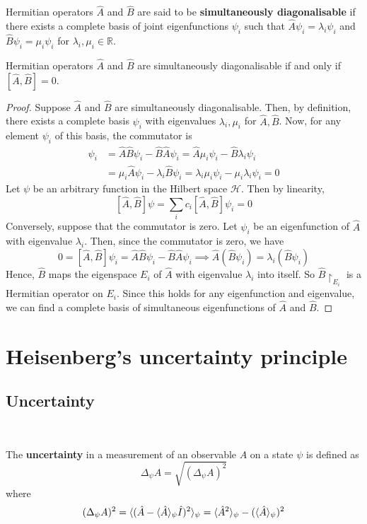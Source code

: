 \documentclass[a4paper,11pt]{article}
\begin{document}
\begin{definition}
	Hermitian operators \( \hat A \) and \( \hat B \) are said to be \textbf{simultaneously diagonalisable} if there exists a complete basis of joint eigenfunctions \( {\psi_i} \) such that \( \hat A \psi_i = \lambda_i \psi_i \) and \( \hat B \psi_i = \mu_i \psi_i \) for \( \lambda_i, \mu_i \in \mathbb R \).
\end{definition}

\begin{theorem}
	Hermitian operators \( \hat A \) and \( \hat B \) are simultaneously diagonalisable if and only if \( [\hat A, \hat B] = 0 \).
\end{theorem}
\begin{proof}
	Suppose \( \hat A \) and \( \hat B \) are simultaneously diagonalisable.
	Then, by definition, there exists a complete basis \( {\psi_i} \) with eigenvalues \( \lambda_i, \mu_i \) for \( \hat A, \hat B \).
	Now, for any element \( \psi_i \) of this basis, the commutator is
	\begin{align*}
        [\hat A, \hat B] \psi_i &= \hat A \hat B \psi_i - \hat B \hat A \psi_i = \hat A \mu_i \psi_i - \hat B \lambda_i \psi_i \\ 
        &= \mu_i \hat A \psi_i - \lambda_i \hat B \psi_i = \lambda_i \mu_i \psi_i - \mu_i \lambda_i \psi_i = 0
    \end{align*}
	Let \( \psi \) be an arbitrary function in the Hilbert space \( \mathcal H \).
	Then by linearity,
	\[
		[\hat A, \hat B] \psi = \sum_i c_i [\hat A, \hat B]\psi_i = 0
	\]
	Conversely, suppose that the commutator is zero.
	Let \( \psi_i \) be an eigenfunction of \( \hat A \) with eigenvalue \( \lambda_i \).
	Then, since the commutator is zero, we have
	\[
		0 = [\hat A, \hat B] \psi_i = \hat A \hat B \psi_i - \hat B \hat A \psi_i \implies \hat A(\hat B \psi_i) = \lambda_i (\hat B \psi_i)
	\]
	Hence, \( \hat B \) maps the eigenspace \( E_i \) of \( \hat A \) with eigenvalue \( \lambda_i \) into itself.
	So \( \hat B\restriction_{E_i} \) is a Hermitian operator on \( E_i \).
	Since this holds for any eigenfunction and eigenvalue, we can find a complete basis of simultaneous eigenfunctions of \( \hat A \) and \( \hat B \).
\end{proof}

\section{Heisenberg's uncertainty principle}
\subsection{Uncertainty}\ \vspace{-1.5em}
\begin{definition}
	The \textbf{uncertainty} in a measurement of an observable \( A \) on a state \( \psi \) is defined as
	\[
		\Delta_\psi A = \sqrt{(\Delta_\psi A)^2}
	\]
    where 
    \[
		(\Delta_\psi A)^2 = \langle{(\hat A - \langle{\hat A}\rangle_\psi \hat I)^2}\rangle_\psi = \langle{\hat A^2}\rangle_\psi - (\langle{\hat A}\rangle_\psi)^2
	\]
\end{definition}
\end{document}
